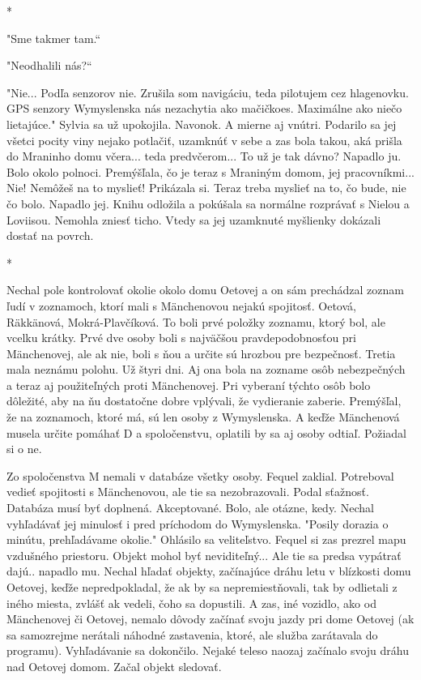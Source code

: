 \documentclass{book}
\begin{document}
\begin{center}

*

\end{center}

"$ $Sme takmer tam.“

"$ $Neodhalili nás?“

"$ $Nie... Podľa senzorov nie. Zrušila som navigáciu, teda pilotujem cez hlagenovku. GPS senzory Wymyslenska nás nezachytia ako mačičkoes. Maximálne ako niečo lietajúce."$ $ Sylvia sa už upokojila. Navonok. A mierne aj vnútri. Podarilo sa jej všetci pocity viny nejako potlačiť, uzamknúť v sebe a zas bola takou, aká prišla do Mraninho domu včera... teda predvčerom... To už je tak dávno? Napadlo ju. Bolo okolo polnoci. Premýšľala, čo je teraz s Mraniným domom, jej pracovníkmi... Nie! Nemôžeš na to myslieť! Prikázala si. Teraz treba myslieť na to, čo bude, nie čo bolo. Napadlo jej. Knihu odložila a pokúšala sa normálne rozprávať s Nielou a Loviisou. Nemohla zniesť ticho. Vtedy sa jej uzamknuté myšlienky dokázali dostať na povrch.

\begin{center}

*

\end{center}

Nechal pole kontrolovať okolie okolo domu Oetovej a on sám prechádzal zoznam ľudí v zoznamoch, ktorí mali s Mänchenovou nejakú spojitosť. Oetová, Räkkänová, Mokrá-Plavčíková. To boli prvé položky zoznamu, ktorý bol, ale vcelku krátky. Prvé dve osoby boli s najväčšou pravdepodobnosťou pri Mänchenovej, ale ak nie, boli s ňou a určite sú hrozbou pre bezpečnosť. Tretia mala neznámu polohu. Už štyri dni. Aj ona bola na zozname osôb nebezpečných a teraz aj použiteľných proti Mänchenovej. Pri vyberaní týchto osôb bolo dôležité, aby na ňu dostatočne dobre vplývali, že vydieranie zaberie. Premýšľal, že na zoznamoch, ktoré má, sú len osoby z Wymyslenska. A keďže Mänchenová musela určite pomáhať D a spoločenstvu, oplatili by sa aj osoby odtiaľ. Požiadal si o ne.

Zo spoločenstva M nemali v databáze všetky osoby. Fequel zaklial. Potreboval vedieť spojitosti s Mänchenovou, ale tie sa nezobrazovali. Podal sťažnosť. Databáza musí byť doplnená. Akceptované. Bolo, ale otázne, kedy. Nechal vyhľadávať jej minulosť i pred príchodom do Wymyslenska. "$ $Posily dorazia o minútu, prehľadávame okolie."$ $ Ohlásilo sa veliteľstvo. Fequel si zas prezrel mapu vzdušného priestoru. Objekt mohol byť neviditeľný... Ale tie sa predsa vypátrať dajú.. napadlo mu. Nechal hľadať objekty, začínajúce dráhu letu v blízkosti domu Oetovej, keďže nepredpokladal, že ak by sa nepremiestňovali, tak by odlietali z iného miesta, zvlášť ak vedeli, čoho sa dopustili. A zas, iné vozidlo, ako od Mänchenovej či Oetovej, nemalo dôvody začínať svoju jazdy pri dome Oetovej (ak sa samozrejme nerátali náhodné zastavenia, ktoré, ale služba zarátavala do programu). Vyhľadávanie sa dokončilo. Nejaké teleso naozaj začínalo svoju dráhu nad Oetovej domom. Začal objekt sledovať.
\end{document}
